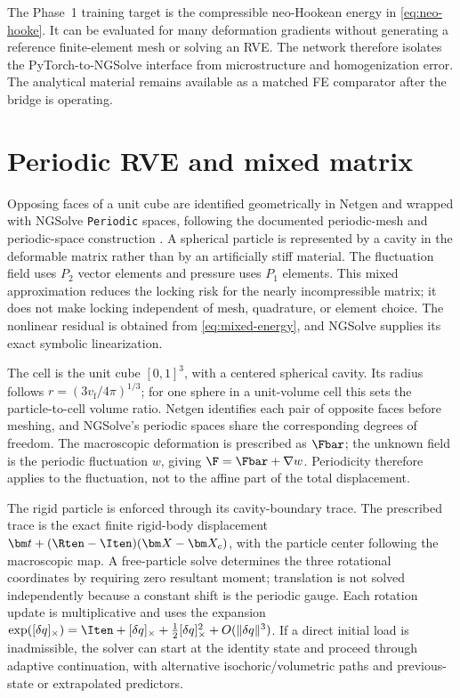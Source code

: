 The Phase~1 training target is the compressible neo-Hookean energy in
\cref{eq:neo-hooke}. It can be evaluated for many deformation gradients
without generating a reference finite-element mesh or solving an RVE. The
network therefore isolates the PyTorch-to-NGSolve interface from
microstructure and homogenization error. The analytical material remains
available as a matched FE comparator after the bridge is operating.

\section{Periodic RVE and mixed matrix}

Opposing faces of a unit cube are identified geometrically in Netgen and
wrapped with NGSolve \texttt{Periodic} spaces, following the documented
periodic-mesh and periodic-space construction \cite{ngsolve_periodic}. A spherical particle is
represented by a cavity in the deformable matrix rather than by an
artificially stiff material. The fluctuation field uses \(P_2\) vector
elements and pressure uses \(P_1\) elements. This mixed approximation reduces
the locking risk for the nearly incompressible matrix; it does not make
locking independent of mesh, quadrature, or element choice. The nonlinear
residual is obtained from \cref{eq:mixed-energy}, and NGSolve supplies its
exact symbolic linearization.

The cell is the unit cube \([0,1]^3\), with a centered spherical cavity. Its
radius follows \(r=(3v_{\mathrm f}/4\pi)^{1/3}\); for one sphere in a
unit-volume cell this sets the particle-to-cell volume ratio. Netgen
identifies each pair of opposite faces before meshing, and NGSolve's
periodic spaces share the corresponding degrees of freedom. The macroscopic
deformation is prescribed as \(\Fbar\); the unknown field is the periodic
fluctuation \(w\), giving \(\F=\Fbar+\nabla w\). Periodicity therefore
applies to the fluctuation, not to the affine part of the total displacement.

The rigid particle is enforced through its cavity-boundary trace. The
prescribed trace is the exact finite rigid-body displacement
\(\bm t+(\Rten-\Iten)(\bm X-\bm X_c)\), with the particle center following
the macroscopic map. A free-particle solve determines the three rotational
coordinates by requiring zero resultant moment; translation is not solved
independently because a constant shift is the periodic gauge. Each rotation
update is multiplicative and uses the expansion
\(\exp([\delta q]_\times)=\Iten+[\delta q]_\times+
\frac12[\delta q]_\times^2+O(\|\delta q\|^3)\). If a direct initial load is
inadmissible, the solver can start at the identity state and proceed through
adaptive continuation, with alternative isochoric/volumetric paths and
previous-state or extrapolated predictors.

